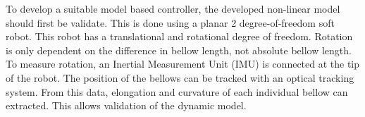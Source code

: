 To develop a suitable model based controller, the developed non-linear model should first be validate. This is done using a planar 2 degree-of-freedom soft robot. This robot has a translational and rotational degree of freedom. Rotation is only dependent on the difference in bellow length, not absolute bellow length. To measure rotation, an Inertial Measurement Unit (IMU) is connected at the tip of the robot. The position of the bellows can be tracked with an optical tracking system. From this data, elongation and curvature of each individual bellow can extracted. This allows validation of the dynamic model.
